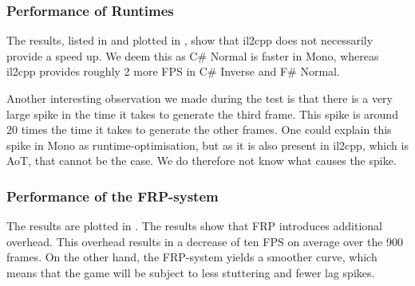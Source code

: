 
\subsubsection{Performance of Runtimes}
The results, listed in  and plotted in , show that il2cpp does not necessarily provide a speed up. We deem this as C\# Normal is faster in Mono, whereas il2cpp provides roughly 2 more \gls{FPS} in C\# Inverse and F\# Normal.

Another interesting observation we made during the test is that there is a very large spike in the time it takes to generate the third frame. This spike is around 20 times the time it takes to generate the other frames. One could explain this spike in Mono as runtime-optimisation, but as it is also present in il2cpp, which is \gls{AoT}, that cannot be the case. We do therefore not know what causes the spike.

\begin{table}[H]
    \caption{Average framerate in Unity's two runtimes measured with 250 unites in the scene.}
    \label{tab:unity:ai:runtime}
\end{table}


\subsubsection{Performance of the FRP-system}
The results are plotted in . The results show that \gls{FRP} introduces additional overhead. This overhead results in a decrease of ten \gls{FPS} on average over the 900 frames. On the other hand, the \gls{FRP}-system yields a smoother curve, which means that the game will be subject to less stuttering and fewer lag spikes.


